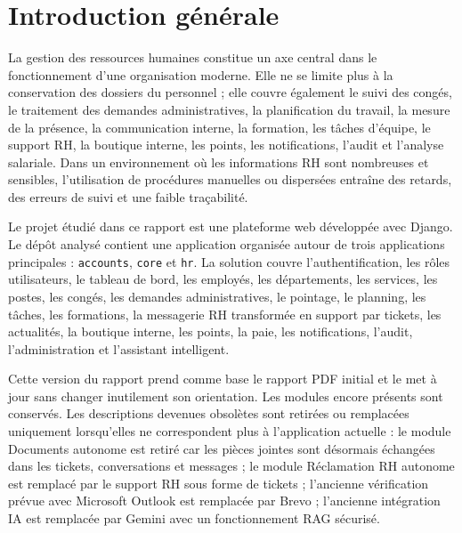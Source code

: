 \documentclass[12pt,a4paper]{report}
\begin{document}
\tableofcontents
\newpage
\listoffigures
{}
\newpage
\listoftables
{}
\newpage

\setcounter{page}{1}

\chapter*{Introduction générale}
La gestion des ressources humaines constitue un axe central dans le fonctionnement d'une organisation moderne. Elle ne se limite plus à la conservation des dossiers du personnel ; elle couvre également le suivi des congés, le traitement des demandes administratives, la planification du travail, la mesure de la présence, la communication interne, la formation, les tâches d'équipe, le support RH, la boutique interne, les points, les notifications, l'audit et l'analyse salariale. Dans un environnement où les informations RH sont nombreuses et sensibles, l'utilisation de procédures manuelles ou dispersées entraîne des retards, des erreurs de suivi et une faible traçabilité.

Le projet étudié dans ce rapport est une plateforme web développée avec Django. Le dépôt analysé contient une application organisée autour de trois applications principales : \texttt{accounts}, \texttt{core} et \texttt{hr}. La solution couvre l'authentification, les rôles utilisateurs, le tableau de bord, les employés, les départements, les services, les postes, les congés, les demandes administratives, le pointage, le planning, les tâches, les formations, la messagerie RH transformée en support par tickets, les actualités, la boutique interne, les points, la paie, les notifications, l'audit, l'administration et l'assistant intelligent.

Cette version du rapport prend comme base le rapport PDF initial et le met à jour sans changer inutilement son orientation. Les modules encore présents sont conservés. Les descriptions devenues obsolètes sont retirées ou remplacées uniquement lorsqu'elles ne correspondent plus à l'application actuelle : le module Documents autonome est retiré car les pièces jointes sont désormais échangées dans les tickets, conversations et messages ; le module Réclamation RH autonome est remplacé par le support RH sous forme de tickets ; l'ancienne vérification prévue avec Microsoft Outlook est remplacée par Brevo ; l'ancienne intégration IA est remplacée par Gemini avec un fonctionnement RAG sécurisé.
\end{document}
